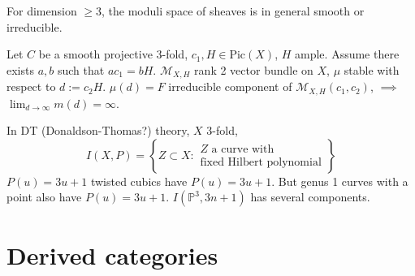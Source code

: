 For dimension $\geq 3$, the moduli space of sheaves is in general smooth or
irreducible.

\begin{theorem}[Ein]
\label{theorem-Ein}
Let $C$ be a smooth projective 3-fold, $c_1,H \in \text{Pic}(X)$, $H$ ample.
Assume there exists $a,b$ such that $ac_1=bH$. $\mathcal{M}_{X,H}$ rank 2 vector
bundle on $X$, $\mu$ stable with respect to $d:=c_2H$. $\mu(d)=F$ irreducible
component of $\mathcal{M}_{X,H}(c_1,c_2)$, $\implies $ 
$\lim_{d \to \infty} m(d)=\infty$.
\end{theorem}

\begin{example}
\label{example-}
In DT (Donaldson-Thomas?) theory, $X$ 3-fold,
$$
I(X,P)=\left\{Z \subset X: \substack{Z \text{ a curve with} \\ 
\text{fixed Hilbert polynomial}}\right\}
$$
$P(u)=3u+1$ twisted cubics have  $P(u)=3u+1$. But genus 1 curves with a
point also have  $P(u)=3u+1$. $I(\mathbb{P}^3,3n+1)$ has several components.
\end{example}


\section{Derived categories}
\label{section-derived-categories}


